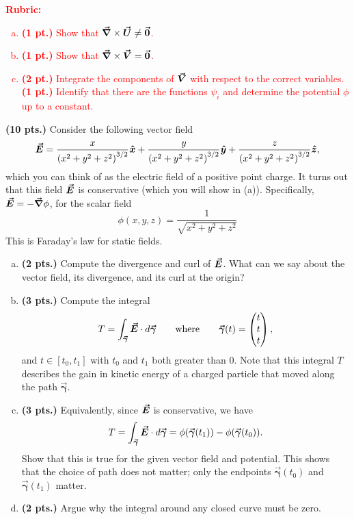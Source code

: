 \documentclass[12pt]{article} %
\newcommand{\curvegamma}{\boldsymbol{\vec{\gamma}}}
\begin{document}
\vspace*{1cm}
\textcolor{red}{
\noindent \textbf{Rubric:}
\begin{enumerate}[(a)]
    \item \textbf{(1 pt.)} Show that $\boldsymbol{\vec{\nabla}} \times \boldsymbol{\vec{U}} \neq \boldsymbol{\vec{0}}$.
	\item \textbf{(1 pt.)} Show that $\boldsymbol{\vec{\nabla}} \times \boldsymbol{\vec{V}} = \boldsymbol{\vec{0}}$.
	\item \textbf{(2 pt.)} Integrate the components of $\boldsymbol{\vec{V}}$ with respect to the correct variables. \textbf{(1 pt.)} Identify that there are the functions $\psi_i$ and determine the potential $\phi$ up to a constant.
\end{enumerate}
}

\newpage
\begin{problem}
\textbf{(10 pts.)} Consider the following vector field
    \[
    \boldsymbol{\vec{E}} = \frac{x}{\left(x^2+y^2+z^2\right)^{3/2}} \boldsymbol{\hat{x}} + \frac{y}{\left(x^2+y^2+z^2\right)^{3/2}} \boldsymbol{\hat{y}} + \frac{z}{\left(x^2+y^2+z^2\right)^{3/2}} \boldsymbol{\hat{z}},
    \]
    which you can think of as the electric field of a positive point charge.  It turns out that this field $\boldsymbol{\vec{E}}$ is conservative (which you will show in (a)). Specifically, $\boldsymbol{\vec{E}} = -\boldsymbol{\vec{\nabla}} \phi$, for the scalar field
\[
\phi(x,y,z) = \frac{1}{\sqrt{x^2+y^2+z^2}}
\]
This is Faraday's law for static fields.
    \begin{enumerate}[(a)]
        \item \textbf{(2 pts.)} Compute the divergence and curl of $\boldsymbol{\vec{E}}$. What can we say about the vector field, its divergence, and its curl at the origin?
        \item \textbf{(3 pts.)} Compute the integral
        \[
        T=\int_{\curvegamma} \vecfieldE \cdot d\curvegamma \qquad \textrm{where} \qquad \curvegamma(t) = \begin{pmatrix} t \\ t \\ t \end{pmatrix},
        \]
        and $t\in [t_0,t_1]$ with $t_0$ and $t_1$ both greater than 0.  Note that this integral $T$ describes the gain in kinetic energy of a charged particle that moved along the path $\curvegamma$.
        \item \textbf{(3 pts.)} Equivalently, since $\boldsymbol{\vec{E}}$ is conservative, we have
        \[
        T=\int_{\curvegamma} \vecfieldE \cdot d\curvegamma = \phi(\curvegamma(t_1))-\phi(\curvegamma(t_0)).
        \]
        Show that this is true for the given vector field and potential. This shows that the choice of path does not matter; only the endpoints $\curvegamma(t_0)$ and $\curvegamma(t_1)$ matter.
        \item \textbf{(2 pts.)} Argue why the integral around any closed curve must be zero.
    \end{enumerate}
\end{problem}
\end{document}
